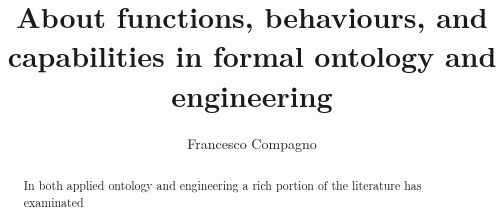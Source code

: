 \documentclass[a4paper,12pt]{article}
\begin{document}
\title{About functions, behaviours, and capabilities in formal ontology and engineering}
\author{Francesco Compagno}

\maketitle


\begin{abstract}
    In both applied ontology and engineering a rich portion of the literature has examinated 
\end{abstract}


\Section{[section 1]}


{}

\end{document}
